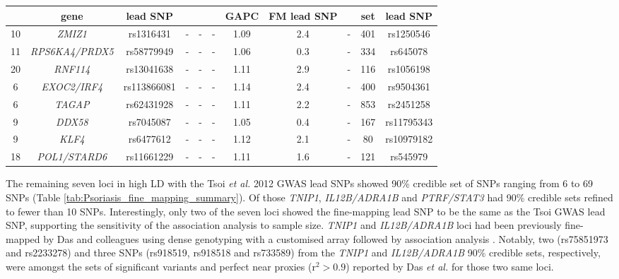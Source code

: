 \begin{landscape}
\begin{center}
\begin{longtable}[ht]{c c c c c c c c c c c}
              & \textbf{gene} & \textbf{lead SNP} &        &                  &           &\textbf{GAPC} & \textbf{FM lead SNP} &             & \textbf{set}           &\textbf{lead SNP} \\
\midrule
\midrule
10 & \textit{ZMIZ1}	                   &  rs1316431	    & -& -& -&  1.09  & 2.4	 & -& 401 &rs1250546\\
11 & \textit{RPS6KA4/PRDX5}	&  rs58779949	& -&- &- &  1.06  & 0.3	 & -& 334 & rs645078  \\
20 & \textit{RNF114}	            & rs13041638	 & -& -& -&   1.11  &2.9	& - & 116 & rs1056198	 \\
6	 & \textit{EXOC2/IRF4}	    & rs113866081	 &- & -&- &  1.14   &2.4	&-   &400 &rs9504361 \\
6	 & \textit{TAGAP}	            & rs62431928	  & -& -& -&   1.11  &2.2	  & -   & 853&rs2451258 \\
9	 & \textit{DDX58}	            & rs7045087	      & -& -& -&   1.05 &0.4	 &  -  & 167 &rs11795343  \\
9	 & \textit{KLF4}	               & rs6477612	     & -&- & -&   1.12  &2.1	  &   - & 80   &rs10979182 \\
18 & \textit{POL1/STARD6}	  & rs11661229	   & -& -&- &   1.11  &1.6	     &  - & 121  &rs545979\\
\bottomrule
\end{longtable}
\end{center}
\end{landscape}


The remaining seven loci in high LD with the Tsoi \textit{et al.} 2012 GWAS lead SNPs showed 90\% credible set of SNPs ranging from 6 to 69 SNPs (Table \ref{tab:Psoriasis_fine_mapping_summary}). Of those \textit{TNIP1}, \textit{IL12B/ADRA1B} and \textit{PTRF/STAT3} had 90\% credible sets refined to fewer than 10 SNPs. Interestingly, only two of the seven loci showed the fine-mapping lead SNP to be the same as the Tsoi GWAS lead SNP, supporting the sensitivity of the association analysis to sample size. \textit{TNIP1} and \textit{IL12B/ADRA1B} loci had been previously fine-mapped by Das and colleagues using dense genotyping with a customised array followed by association analysis \parencite{Das2014}. Notably, two (rs75851973 and rs2233278) and three SNPs (rs918519, rs918518 and rs733589) from the \textit{TNIP1} and \textit{IL12B/ADRA1B} 90\% credible sets, respectively, were amongst the sets of significant variants and perfect near proxies (r$^2>0.9$) reported  by Das \textit{et al.} for those two same loci.  





